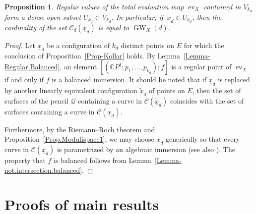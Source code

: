 \documentclass[10pt,a4paper]{article}
\numberwithin{equation}{section}
\theoremstyle{definition}
\theoremstyle{plain}
\newtheorem{proposition}[definition]{Proposition}
\theoremstyle{remark}
\newcommand{\C}{\mathbb{C}}
\DeclareMathOperator{\GW}{GW}
\DeclareMathOperator{\ev}{ev}
\begin{document}
     \begin{proposition}\label{Prop.Modulispace2}
Regular values of the total evaluation map $\ev_{X}$ contained in $V_{k_d}$ form a dense open subset $U_{k_d}\subset V_{k_d}$.
In particular, if\, $\underline{x}_d\in U_{k_d}$, then the cardinality of the set $\mathcal{C}_{d}(\underline{x}_d)$ is equal to $\GW_X(d)$.
    \end{proposition}
    
      
    \begin{proof}
    Let $\underline{x}_d$ be a configuration of $k_d$ distinct points on $E$ for which the conclusion of Proposition~\ref{Prop-Kollar} holds. 
    By Lemma~\ref{Lemma-Regular.Balanced}, an element $[(\C P^1;p_1,\ldots,p_{k_d});f]$ is a regular point of $\ev_X$ if and only if $f$ is a balanced immersion. It should be noted that if $\underline{x}_d$  is replaced  by another linearly equivalent configuration  $\tilde{\underline{x}}_d$ of points on $E$, then the set of surfaces of the pencil $\mathcal{Q}$ containing a curve in $\mathcal{C}(\tilde{\underline{x}}_d)$ coincides with the set of surfaces containing a curve in $\mathcal{C}(\underline{x}_d)$.

Furthermore, by the Riemann--Roch theorem and Proposition~\ref{Prop.Modulispace1}, we may choose ${\underline{x}_d}$ generically so that every curve in $\mathcal{C}({\underline{x}_d})$  is parametrized by an algebraic immersion (see also  \cite[Proof of Proposition 5.3]{brugalle2016pencils}). The property that $f$ is balanced follows from Lemma~\ref{Lemma-not.intersection.balanced}.
    \end{proof}
    

 

\setcounter{section}{4}\setcounter{subsection}{0}

\section{Proofs of main results}
\label{Sect-proofs}
\end{document}
